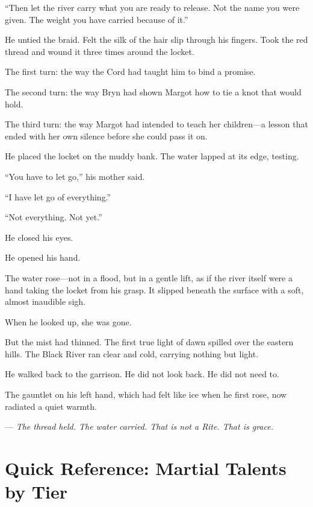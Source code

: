 \documentclass[9pt,a5paper]{extbook}
\begin{document}
``Then let the river carry what you are ready to release. Not the name you were given. The weight you have carried because of it.''

He untied the braid. Felt the silk of the hair slip through his fingers. Took the red thread and wound it three times around the locket.

The first turn: the way the Cord had taught him to bind a promise.

The second turn: the way Bryn had shown Margot how to tie a knot that would hold.

The third turn: the way Margot had intended to teach her children---a lesson that ended with her own silence before she could pass it on.

He placed the locket on the muddy bank. The water lapped at its edge, testing.

``You have to let go,'' his mother said.

``I have let go of everything.''

``Not everything. Not yet.''

He closed his eyes.

He opened his hand.

The water rose---not in a flood, but in a gentle lift, as if the river itself were a hand taking the locket from his grasp. It slipped beneath the surface with a soft, almost inaudible sigh.

When he looked up, she was gone.

But the mist had thinned. The first true light of dawn spilled over the eastern hills. The Black River ran clear and cold, carrying nothing but light.

He walked back to the garrison. He did not look back. He did not need to.

The gauntlet on his left hand, which had felt like ice when he first rose, now radiated a quiet warmth.

--- \textit{The thread held. The water carried. That is not a Rite. That is grace.}

\chapter{Quick Reference: Martial Talents by Tier}
\end{document}
